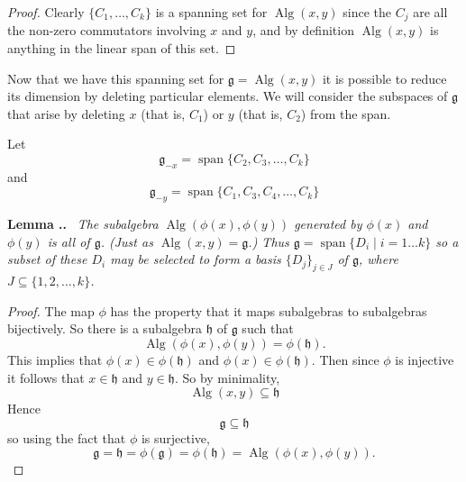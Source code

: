 \documentclass[honours]{UNSWthesis}
\newcommand{\g}{\mathfrak{g}}
\newcommand{\1}{\mathbf{e}_{1}}
\newcommand{\2}{\mathbf{e}_{3}}
\newcommand{\3}{\mathbf{e}_{3}}
\DeclareMathOperator{\alg}{Alg}
\DeclareMathOperator{\spn}{span}
\newcounter{Item}[section]
\newenvironment{Lemma}{\medskip
                            \refstepcounter{Item}
                            \noindent
                           {\bf Lemma \thesection.\theItem.}\ %
                            \begingroup \sl}
                           {\endgroup\medskip}
\begin{document}
\begin{proof}

Clearly $\{ C_{1},\ldots,C_{k} \}$ is a spanning set for $\alg(x,y)$ since the $C_{j}$ are all the non-zero commutators involving $x$ and $y$, and by definition $\alg(x,y)$ is anything in the linear span of this set.

\end{proof}
Now that we have this spanning set for $\g=\alg(x,y)$ it is possible to reduce its dimension by deleting particular elements. We will consider the subspaces of $\g$ that arise by deleting $x$ (that is, $C_{1}$) or $y$ (that is, $C_{2}$) from the span. 

Let 
\[
\g_{-x}=\spn \{ C_{2},C_{3},\ldots,C_{k} \}
\]
and
\[
\g_{-y}=\spn \{C_{1},C_{3},C_{4},\ldots,C_{k} \}
\]




\begin{Lemma}\label{generateWithDs}
The subalgebra $\alg(\phi(x),\phi(y))$ generated by $\phi(x)$ and $\phi(y)$ is all of $\g$. (Just as $\alg(x,y)=\g$.) Thus $\g =\spn \{ D_{i} \mid i=1 \dots k  \} $ so a subset of these $D_{i}$ may be selected to form a basis $\{D_{j} \}_{j \in J}$ of $\g$, where $J \subseteq \{ 1,2,\ldots ,k \}$.
\end{Lemma}

\begin{proof}
The map $\phi$ has the property that it maps subalgebras to subalgebras bijectively. So there is a subalgebra $\mathfrak{h}$ of $\g$ such that 
\[
\alg(\phi(x),\phi(y))= \phi(\mathfrak{h}).
\]
This implies that $\phi(x)\in  \phi(\mathfrak{h})$ and $\phi(x)\in  \phi(\mathfrak{h})$. Then since $\phi$ is injective it follows that $x \in \mathfrak{h}$ and $y \in \mathfrak{h}$. So by minimality, 
\[
\alg(x,y) \subseteq \mathfrak{h}
\]
Hence 
\[
\g\subseteq \mathfrak{h} 
\]
so using the fact that $\phi$ is surjective,
\[
\g=\mathfrak{h} =\phi(\g)=\phi(\mathfrak{h})=\alg(\phi(x),\phi(y)).
\]

\end{proof}
\end{document}
